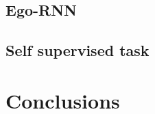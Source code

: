 \documentclass[10pt,twocolumn,letterpaper]{article}
\begin{document}
\subsection{Ego-RNN}

\subsection{Self supervised task}

\section{Conclusions}

{\small


}
\end{document}
